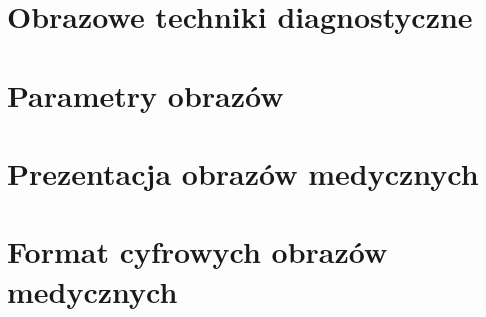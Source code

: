 
\section{Obrazowe techniki diagnostyczne}


\section{Parametry obrazów}


\section{Prezentacja obrazów medycznych}


\section{Format cyfrowych obrazów medycznych}


